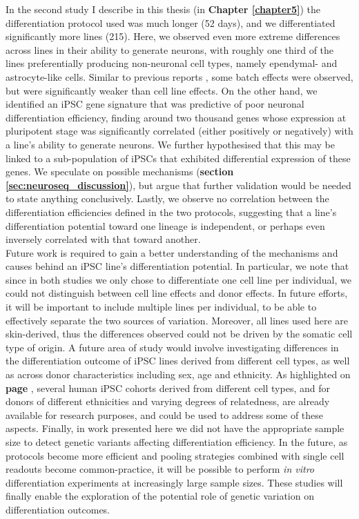 In the second study I describe in this thesis (in \textbf{Chapter \ref{chapter5}}) the differentiation protocol used was much longer (52 days), and we differentiated significantly more lines (215).
Here, we observed even more extreme differences across lines in their ability to generate neurons, with roughly one third of the lines preferentially producing non-neuronal cell types, namely ependymal- and astrocyte-like cells.
Similar to previous reports \cite{schwartzentruber2018molecular}, some batch effects were observed, but were significantly weaker than cell line effects.
On the other hand, we identified an iPSC gene signature that was predictive of poor neuronal differentiation efficiency, finding around two thousand genes whose expression at pluripotent stage was significantly correlated (either positively or negatively) with a line's ability to generate neurons. 
We further hypothesised that this may be linked to a sub-population of iPSCs that exhibited differential expression of these genes.
We speculate on possible mechanisms (\textbf{section
\ref{sec:neuroseq_discussion}}), but argue that further validation would be needed to state anything conclusively.
Lastly, we observe no correlation between the differentiation efficiencies defined in the two protocols, suggesting that a line's differentiation potential toward one lineage is independent, or perhaps even inversely correlated with that toward another. \\

Future work is required to gain a better understanding of the mechanisms and causes behind an iPSC line's differentiation potential.
In particular, we note that since in both studies we only chose to differentiate one cell line per individual, we could not distinguish between cell line effects and donor effects.
In future efforts, it will be important to include multiple lines per individual, to be able to effectively separate the two sources of variation.
Moreover, all lines used here are skin-derived, thus the differences observed could not be driven by the somatic cell type of origin.
A future area of study would involve investigating differences in the differentiation outcome of iPSC lines derived from different cell types, as well as across donor characteristics including sex, age and ethnicity.
As highlighted on \textbf{page \pageref{sec:HipSci}}, several human iPSC cohorts derived from different cell types, and for donors of different ethnicities and varying degrees of relatedness, are already available for research purposes, and could be used to address some of these aspects.
Finally, in work presented here we did not have the appropriate sample size to detect genetic variants affecting differentiation efficiency.
In the future, as protocols become more efficient and pooling strategies combined with single cell readouts become common-practice, it will be possible to perform \textit{in vitro} differentiation experiments at increasingly large sample sizes.
These studies will finally enable the exploration of the potential role of genetic variation on differentiation outcomes. \\

